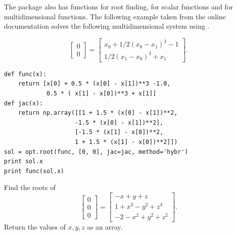 The  package also has functions for root finding, for scalar functions and for multidimensional functions. The following example taken from the online documentation solves the following multidimensional system using .

\[
\begin{bmatrix}
	0 \\
	0
\end{bmatrix} = \begin{bmatrix}
	x_{0} + 1/2 ( x_{0} - x_{1} )^{3} - 1 \\
	1/2(x_{1}-x_{0})^{3} + x_{1}
\end{bmatrix}.
\]

\begin{lstlisting}
def func(x):
    return [x[0] + 0.5 * (x[0] - x[1])**3 -1.0,
            0.5 * ( x[1] - x[0])**3 + x[1]]
def jac(x):
    return np.array([[1 + 1.5 * (x[0] - x[1])**2,
                    -1.5 * (x[0] - x[1])**2],
                    [-1.5 * (x[1] - x[0])**2,
                    1 + 1.5 * (x[1] - x[0])**2]])
sol = opt.root(func, [0, 0], jac=jac, method='hybr')
print sol.x
print func(sol.x)
\end{lstlisting}

\begin{problem}
Find the roots of
\[
\begin{bmatrix}
	0 \\
	0 \\
	0
\end{bmatrix} = \begin{bmatrix}
	-x+y+z \\
	1+x^3-y^2+z^3\\
	-2-x^2+y^2+z^2
\end{bmatrix}.
\]
Return the values of $x,y,z$ as an array.
\end{problem}



